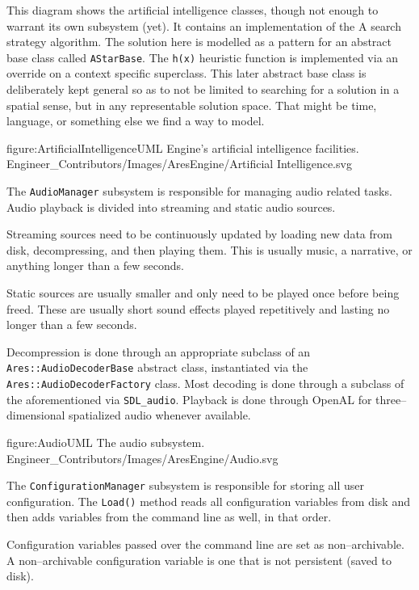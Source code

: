 This diagram shows the artificial intelligence classes, though not enough to warrant its own subsystem (yet). It contains an implementation of the A\high{*} search strategy algorithm. The solution here is modelled as a pattern for an abstract base class called {\tt AStarBase}. The {\tt h(x)} heuristic function is implemented via an override on a context specific superclass. This later abstract base class is deliberately kept general so as to not be limited to searching for a solution in a spatial sense, but in any representable solution space. That might be time, language, or something else we find a way to model.

\FullPageDiagram
    {figure:ArtificialIntelligenceUML}
    {Engine's artificial intelligence facilities.}
    {Engineer_Contributors/Images/AresEngine/Artificial Intelligence.svg}

\page
{}
The {\tt AudioManager} subsystem is responsible for managing audio related tasks. Audio playback is divided into streaming and static audio sources.

Streaming sources need to be continuously updated by loading new data from disk, decompressing, and then playing them. This is usually music, a narrative, or anything longer than a few seconds.

Static sources are usually smaller and only need to be played once before being freed. These are usually short sound effects played repetitively and lasting no longer than a few seconds.

Decompression is done through an appropriate subclass of an {\tt Ares::AudioDecoderBase} abstract class, instantiated via the {\tt Ares::AudioDecoderFactory} class. Most decoding is done through a subclass of the aforementioned via {\tt SDL_audio}. Playback is done through OpenAL for three--dimensional spatialized audio whenever available.

\FullPageDiagram
    {figure:AudioUML}
    {The audio subsystem.}
    {Engineer_Contributors/Images/AresEngine/Audio.svg}

\page
{}
The {\tt ConfigurationManager} subsystem is responsible for storing all user configuration. The {\tt Load()} method reads all configuration variables from disk and then adds variables from the command line as well, in that order. 

Configuration variables passed over the command line are set as non--archivable. A non--archivable configuration variable is one that is not persistent (saved to disk).

